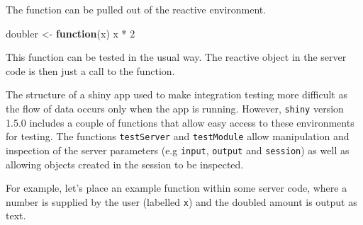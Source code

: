 \documentclass[
]{book}
\newenvironment{Shaded}{\begin{snugshade}}{\end{snugshade}}
\newcommand{\ControlFlowTok}[1]{\textcolor[rgb]{0.13,0.29,0.53}{\textbf{#1}}}
\newcommand{\DecValTok}[1]{\textcolor[rgb]{0.00,0.00,0.81}{#1}}
\newcommand{\FunctionTok}[1]{\textcolor[rgb]{0.00,0.00,0.00}{#1}}
\newcommand{\NormalTok}[1]{#1}
\newcommand{\OtherTok}[1]{\textcolor[rgb]{0.56,0.35,0.01}{#1}}
\newcommand{\SpecialCharTok}[1]{\textcolor[rgb]{0.00,0.00,0.00}{#1}}
\newcommand{\StringTok}[1]{\textcolor[rgb]{0.31,0.60,0.02}{#1}}
\begin{document}
\begin{Shaded}
\end{Shaded}

The function can be pulled out of the reactive environment.

\begin{Shaded}
\begin{Highlighting}[]
\NormalTok{doubler }\OtherTok{\textless{}{-}} \ControlFlowTok{function}\NormalTok{(x) x }\SpecialCharTok{*} \DecValTok{2}
\end{Highlighting}
\end{Shaded}

This function can be tested in the usual way. The reactive object in the server code is then just a call to the function.

\begin{Shaded}
\end{Shaded}

The structure of a shiny app used to make integration testing more difficult as the flow of data occurs only when the app is running. However, \texttt{shiny} version 1.5.0 includes a couple of functions that allow easy access to these environments for testing. The functions \texttt{testServer} and \texttt{testModule} allow manipulation and inspection of the server parameters (e.g \texttt{input}, \texttt{output} and \texttt{session}) as well as allowing objects created in the session to be inspected.

For example, let's place an example function within some server code, where a number is supplied by the user (labelled \texttt{x}) and the doubled amount is output as text.

\begin{Shaded}
\end{Shaded}
\end{document}
